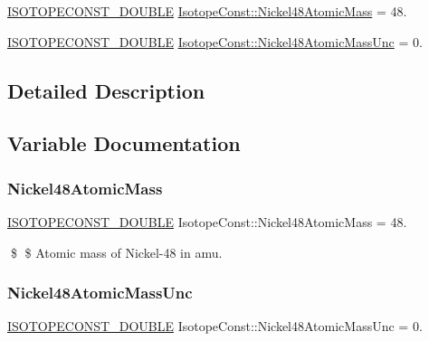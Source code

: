 \begin{DoxyCompactItemize}
\item 
\mbox{\hyperlink{group___isotope_const-_macros_ga8f45a7272ce02c0b4c65c44636ed719a}{I\+S\+O\+T\+O\+P\+E\+C\+O\+N\+S\+T\+\_\+\+D\+O\+U\+B\+LE}} \mbox{\hyperlink{group___isotope_const-_nickel-_ni48_ga9ec8025d0b1306a0589576044d5d4218}{Isotope\+Const\+::\+Nickel48\+Atomic\+Mass}} = 48.
\item 
\mbox{\hyperlink{group___isotope_const-_macros_ga8f45a7272ce02c0b4c65c44636ed719a}{I\+S\+O\+T\+O\+P\+E\+C\+O\+N\+S\+T\+\_\+\+D\+O\+U\+B\+LE}} \mbox{\hyperlink{group___isotope_const-_nickel-_ni48_ga5edbc62cd8d4eefd9e532a6474d387a6}{Isotope\+Const\+::\+Nickel48\+Atomic\+Mass\+Unc}} = 0.
\end{DoxyCompactItemize}


\subsection{Detailed Description}


\subsection{Variable Documentation}
\mbox{\label{group___isotope_const-_nickel-_ni48_ga9ec8025d0b1306a0589576044d5d4218}} 
\subsubsection{\texorpdfstring{Nickel48\+Atomic\+Mass}{Nickel48AtomicMass}}
{\footnotesize\ttfamily \mbox{\hyperlink{group___isotope_const-_macros_ga8f45a7272ce02c0b4c65c44636ed719a}{I\+S\+O\+T\+O\+P\+E\+C\+O\+N\+S\+T\+\_\+\+D\+O\+U\+B\+LE}} Isotope\+Const\+::\+Nickel48\+Atomic\+Mass = 48.}

\$ \$ Atomic mass of Nickel-\/48 in amu. \mbox{\label{group___isotope_const-_nickel-_ni48_ga5edbc62cd8d4eefd9e532a6474d387a6}} 
\subsubsection{\texorpdfstring{Nickel48\+Atomic\+Mass\+Unc}{Nickel48AtomicMassUnc}}
{\footnotesize\ttfamily \mbox{\hyperlink{group___isotope_const-_macros_ga8f45a7272ce02c0b4c65c44636ed719a}{I\+S\+O\+T\+O\+P\+E\+C\+O\+N\+S\+T\+\_\+\+D\+O\+U\+B\+LE}} Isotope\+Const\+::\+Nickel48\+Atomic\+Mass\+Unc = 0.}

